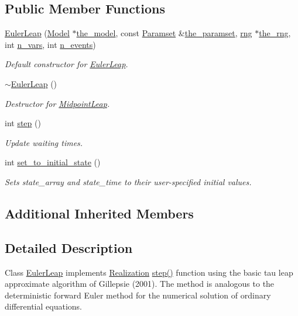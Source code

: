 \subsection*{Public Member Functions}
\begin{DoxyCompactItemize}
\item 
\hyperlink{class_euler_leap_ae5db6ea05659798b624a28872799b906}{Euler\+Leap} (\hyperlink{class_model}{Model} $\ast$\hyperlink{class_realization_a47ec1d062b8caee874b08c1a17d6aeeb}{the\+\_\+model}, const \hyperlink{class_paramset}{Paramset} \&\hyperlink{class_realization_a119bb29de88929bc51bc1b329473a94b}{the\+\_\+paramset}, \hyperlink{classrng}{rng} $\ast$\hyperlink{class_realization_ac8d358d929afae90cf5790675b6744f9}{the\+\_\+rng}, int \hyperlink{class_realization_ad9951a0829e68e12fcb3817735bb5097}{n\+\_\+vars}, int \hyperlink{class_realization_afb711282bef806fc0020f91252d1df2c}{n\+\_\+events})
\begin{DoxyCompactList}\small\item\em Default constructor for \hyperlink{class_euler_leap}{Euler\+Leap}. \end{DoxyCompactList}\item 
\hyperlink{class_euler_leap_a2c4f981e34196c279e8b13c41fbd43da}{$\sim$\+Euler\+Leap} ()
\begin{DoxyCompactList}\small\item\em Destructor for \hyperlink{class_midpoint_leap}{Midpoint\+Leap}. \end{DoxyCompactList}\item 
int \hyperlink{class_euler_leap_a25b1ea90a95bfd41ecb919605683da9d}{step} ()
\begin{DoxyCompactList}\small\item\em Update waiting times. \end{DoxyCompactList}\item 
int \hyperlink{class_euler_leap_a1a13929ea1ebf40e7357439968828f4b}{set\+\_\+to\+\_\+initial\+\_\+state} ()
\begin{DoxyCompactList}\small\item\em Sets state\+\_\+array and state\+\_\+time to their user-\/specified initial values. \end{DoxyCompactList}\end{DoxyCompactItemize}
\subsection*{Additional Inherited Members}


\subsection{Detailed Description}
Class \hyperlink{class_euler_leap}{Euler\+Leap} implements \hyperlink{class_realization}{Realization} \hyperlink{class_euler_leap_a25b1ea90a95bfd41ecb919605683da9d}{step()} function using the basic tau leap approximate algorithm of Gillepsie (2001). The method is analogous to the deterministic forward Euler method for the numerical solution of ordinary differential equations. 

